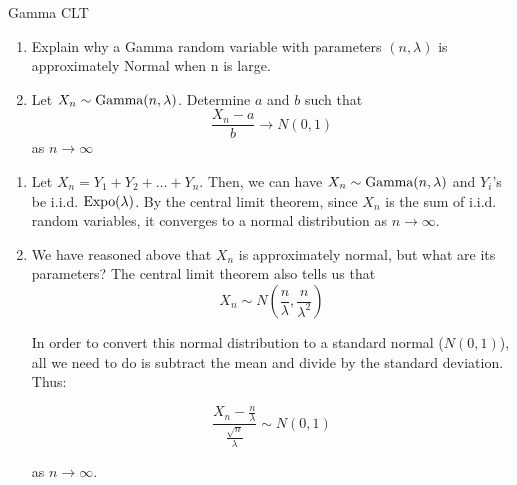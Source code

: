 \documentclass[11.5pt]{article}
\begin{document}
\begin{exercise}{Gamma CLT}
\end{exercise}
\begin{enumerate}
\vspace{-1.5em}
\item Explain why a Gamma random variable with parameters $(n, \lambda)$ is approximately Normal when n is large.

\item Let $X_n \sim \textrm{Gamma}(n, \lambda)$. Determine $a$ and $b$ such that 
$$ \frac{X_n - a}{b} \to N(0,1)$$
as $n \to \infty$
\end{enumerate}

\begin{solution}{2.5}
\vspace{-1em}
\begin{enumerate}
\item Let $X_n = Y_1 + Y_2 + \ldots + Y_n$. Then, we can have $X_n \sim \textrm{Gamma}(n, \lambda)$ and $Y_i$'s be i.i.d. $\textrm{Expo}(\lambda)$. By the central limit theorem, since $X_n$ is the sum of i.i.d. random variables, it converges to a normal distribution as $n \to \infty$. 
\item We have reasoned above that $X_n$ is approximately normal, but what are its parameters? The central limit theorem also tells us that $$ X_n \sim N\left(\frac{n}{\lambda}, \frac{n}{\lambda^2}  \right)$$

In order to convert this normal distribution to a standard normal ($N(0,1)$), all we need to do is subtract the mean and divide by the standard deviation. Thus: 

$$ \frac{X_n - \frac{n}{\lambda}}{\frac{\sqrt{n}}{\lambda}} \sim N(0,1)$$

as $n \to \infty$. 
\end{enumerate}
\end{solution}



\end{document}
